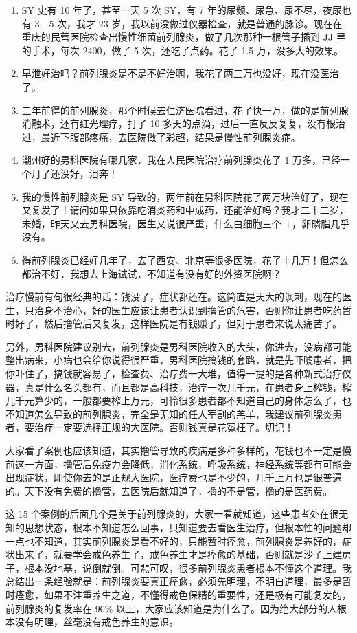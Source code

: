 \documentclass{ctexart}
\begin{document}
\begin{enumerate}
    \item SY 史有 10 年了，甚至一天 5 次 SY，有 7 年的尿频、尿急、尿不尽，夜尿也有 3 - 5 次，我才 23 岁，我以前没做过仪器检查，就是普通的脉诊。现在在重庆的民营医院检查出慢性细菌前列腺炎，做了几次那种一根管子插到 JJ 里的手术，每次 2400，做了 5 次，还吃了点药。花了 1.5 万，没多大的效果。
    \item 早泄好治吗？前列腺炎是不是不好治啊，我花了两三万也没好，现在没医治了。
    \item 三年前得的前列腺炎，那个时候去仁济医院看过，花了快一万，做的是前列腺消融术，还有红光理疗，打了 10 多天的点滴，过后一直反反复复，没有根治过，最近下腹部疼痛，去医院做了彩超，结果是慢性前列腺炎症。
    \item 潮州好的男科医院有哪几家，我在人民医院治疗前列腺炎花了 1 万多，已经一个月了还没好，泪奔！
    \item 我的慢性前列腺炎是 SY 导致的，两年前在男科医院花了两万块治好了，现在又复发了！请问如果只依靠吃消炎药和中成药，还能治好吗？我才二十二岁，未婚，昨天又去男科医院，医生又说很严重，什么白细胞三个 +，卵磷脂几乎没有。
    \item 得前列腺炎已经好几年了，去了西安、北京等很多医院，花了十几万！但怎么都治不好，我想去上海试试，不知道有没有好的外资医院啊？
\end{enumerate}

治疗慢前有句很经典的话：钱没了，症状都还在。这简直是天大的讽刺，现在的医生，只治身不治心，好的医生应该让患者认识到撸管的危害，否则你让患者吃药暂时好了，然后撸管后又复发，这样医院是有钱赚了，但对于患者来说太痛苦了。

另外，男科医院建议别去，前列腺炎是男科医院收入的大头，你进去，没病都可能整出病来，小病也会给你说得很严重，男科医院搞钱的套路，就是先吓唬患者，把你吓住了，搞钱就容易了，检查费、治疗费一大堆，值得一提的是各种新式治疗仪器，真是什么名头都有，而且都是高科技，治疗一次几千元，在患者身上榨钱，榨几千元算少的，一般都要榨上万元，可怜很多患者都不知道自己的身体怎么了，也不知道怎么导致的前列腺炎，完全是无知的任人宰割的羔羊，我建议前列腺炎患者，要治疗一定要选择正规的大医院。否则钱真是花冤枉了。切记！

大家看了案例也应该知道，其实撸管导致的疾病是多种多样的，花钱也不一定是慢前这一方面，撸管后免疫力会降低，消化系统，呼吸系统，神经系统等都有可能会出现症状，即使你去的是正规大医院，医疗费也是不少的，几千上万也是很普遍的。天下没有免费的撸管，去医院后就知道了，撸的不是管，撸的是医药费。

这 15 个案例的后面几个是关于前列腺炎的，大家一看就知道，这些患者处在很无知的思想状态，根本不知道怎么回事，只知道要去看医生治疗，但根本性的问题却一点也不知道，其实前列腺炎是看不好的，只能暂时痊愈，前列腺炎是养好的，症状出来了，就要学会戒色养生了，戒色养生才是痊愈的基础，否则就是沙子上建房子，根本没地基，说倒就倒。可悲可叹，很多前列腺炎患者根本不懂这个道理。我总结出一条经验就是：前列腺炎要真正痊愈，必须先明理，不明白道理，最多是暂时痊愈，如果不注重养生之道，不懂得戒色保精的重要性，还是极有可能复发的，前列腺炎的复发率在 90\% 以上，大家应该知道是为什么了。因为绝大部分的人根本没有明理，丝毫没有戒色养生的意识。
\end{document}
